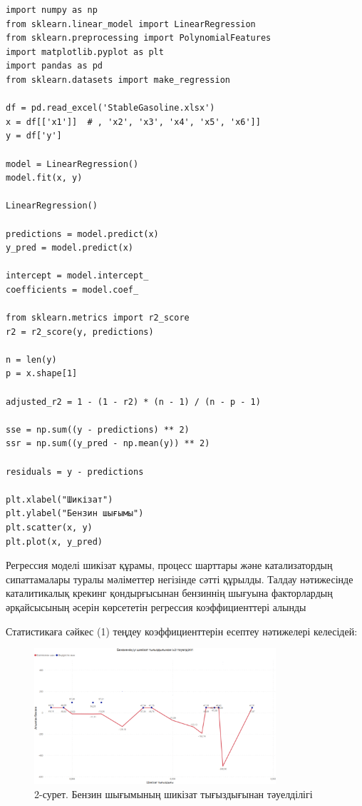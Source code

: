 \begin{lstlisting}
import numpy as np
from sklearn.linear_model import LinearRegression
from sklearn.preprocessing import PolynomialFeatures
import matplotlib.pyplot as plt
import pandas as pd
from sklearn.datasets import make_regression

df = pd.read_excel('StableGasoline.xlsx')
x = df[['x1']]  # , 'x2', 'x3', 'x4', 'x5', 'x6']]
y = df['y']

model = LinearRegression()
model.fit(x, y)

LinearRegression()

predictions = model.predict(x)
y_pred = model.predict(x)

intercept = model.intercept_
coefficients = model.coef_

from sklearn.metrics import r2_score
r2 = r2_score(y, predictions)

n = len(y)
p = x.shape[1]

adjusted_r2 = 1 - (1 - r2) * (n - 1) / (n - p - 1)

sse = np.sum((y - predictions) ** 2)
ssr = np.sum((y_pred - np.mean(y)) ** 2)

residuals = y - predictions

plt.xlabel("Шикізат")
plt.ylabel("Бензин шығымы")
plt.scatter(x, y)
plt.plot(x, y_pred)
\end{lstlisting}

\begin{multicols}{2}
Регрессия моделі шикізат құрамы, процесс шарттары және катализатордың
сипаттамалары туралы мәліметтер негізінде сәтті құрылды. Талдау
нәтижесінде каталитикалық крекинг қондырғысынан бензиннің шығуына
факторлардың әрқайсысының әсерін көрсететін регрессия коэффициенттері
алынды

Статистикаға сәйкес (1) теңдеу коэффициенттерін есептеу нәтижелері
келесідей:
\end{multicols}

\begin{figure}[H]
	\centering
	\includegraphics[width=0.8\textwidth]{media/ict/image95}
	\caption*{2-сурет. Бензин шығымының шикізат тығыздығынан тәуелділігі}
\end{figure}


